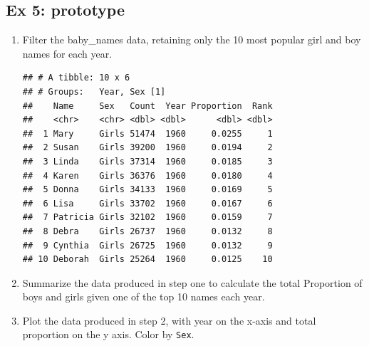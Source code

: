 \documentclass[]{book}
\newenvironment{Shaded}{\begin{snugshade}}{\end{snugshade}}
\newcommand{\KeywordTok}[1]{\textcolor[rgb]{0.13,0.29,0.53}{\textbf{#1}}}
\newcommand{\DataTypeTok}[1]{\textcolor[rgb]{0.13,0.29,0.53}{#1}}
\newcommand{\DecValTok}[1]{\textcolor[rgb]{0.00,0.00,0.81}{#1}}
\newcommand{\StringTok}[1]{\textcolor[rgb]{0.31,0.60,0.02}{#1}}
\newcommand{\CommentTok}[1]{\textcolor[rgb]{0.56,0.35,0.01}{\textit{#1}}}
\newcommand{\OperatorTok}[1]{\textcolor[rgb]{0.81,0.36,0.00}{\textbf{#1}}}
\newcommand{\NormalTok}[1]{#1}
\begin{document}
\subsection{Ex 5: prototype}\label{ex-5-prototype}

\begin{enumerate}
\def\labelenumi{\arabic{enumi}.}
\item
  Filter the baby\_names data, retaining only the 10 most popular girl
  and boy names for each year.

\begin{Shaded}
\end{Shaded}

\begin{verbatim}
## # A tibble: 10 x 6
## # Groups:   Year, Sex [1]
##    Name     Sex   Count  Year Proportion  Rank
##    <chr>    <chr> <dbl> <dbl>      <dbl> <dbl>
##  1 Mary     Girls 51474  1960     0.0255     1
##  2 Susan    Girls 39200  1960     0.0194     2
##  3 Linda    Girls 37314  1960     0.0185     3
##  4 Karen    Girls 36376  1960     0.0180     4
##  5 Donna    Girls 34133  1960     0.0169     5
##  6 Lisa     Girls 33702  1960     0.0167     6
##  7 Patricia Girls 32102  1960     0.0159     7
##  8 Debra    Girls 26737  1960     0.0132     8
##  9 Cynthia  Girls 26725  1960     0.0132     9
## 10 Deborah  Girls 25264  1960     0.0125    10
\end{verbatim}
\item
  Summarize the data produced in step one to calculate the total
  Proportion of boys and girls given one of the top 10 names each year.

\begin{Shaded}
\end{Shaded}
\item
  Plot the data produced in step 2, with year on the x-axis and total
  proportion on the y axis. Color by \texttt{Sex}.


\end{enumerate}
\end{document}

